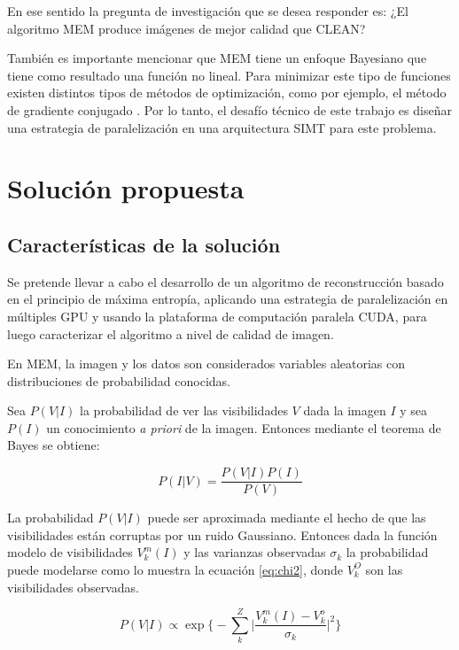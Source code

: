 En ese sentido la pregunta de investigación que se desea responder es: ¿El algoritmo MEM produce imágenes de mejor calidad que CLEAN?

También es importante mencionar que MEM tiene un enfoque Bayesiano que tiene como resultado una función no lineal. Para minimizar este tipo de funciones existen distintos tipos de métodos de optimización, como por ejemplo, el método de gradiente conjugado \citep{ncg}. Por lo tanto, el desafío técnico de este trabajo es diseñar una estrategia de paralelización en una arquitectura SIMT para este problema.



\section{Soluci\'on propuesta}
\label{intro:solucion}
\subsection{Características de la solución}
\label{subsec:caracteristicas}
Se pretende llevar a cabo el desarrollo de un algoritmo de reconstrucción basado en el principio de máxima entropía, aplicando una estrategia de paralelización en múltiples GPU y usando la plataforma de computación paralela CUDA, para luego caracterizar el algoritmo a nivel de calidad de imagen.

En MEM, la imagen y los datos son considerados variables aleatorias con distribuciones de probabilidad conocidas.

Sea $P(V|I)$ la probabilidad de ver las visibilidades $V$ dada la imagen $I$ y sea $P(I)$ un conocimiento \textit{a priori} de la imagen. Entonces mediante el teorema de Bayes se obtiene:

\begin{equation}
P(I|V) = \frac{P(V|I)P(I)}{P(V)}
\label{eq:bayes}
\end{equation}	

La probabilidad $P(V|I)$ puede ser aproximada mediante el hecho de que las visibilidades están corruptas por un ruido Gaussiano. Entonces dada la función modelo de visibilidades $V_{k}^{m}(I)$ y las varianzas observadas $\sigma_k$ la probabilidad puede modelarse como lo muestra la ecuación \ref{eq:chi2}, donde $V_{k}^{O}$ son las visibilidades observadas.

\begin{equation}
 P(V|I) \propto \exp\biggl\{-\sum_k^{Z}{\biggl|\frac{V^m_k(I)-V^o_k}{\sigma_k}}\biggr|^2\biggr\}
 \label{eq:chi2}
\end{equation} 

